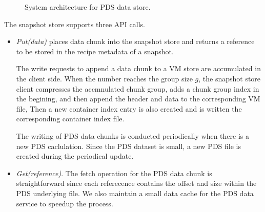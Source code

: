 \begin{figure}[htbp]
  \centering
  \caption{System architecture for PDS data store.}
  \label{fig:as_arch}
\end{figure}

The snapshot  store supports three API calls.
\begin{itemize}

\item {\em Put(data)} places data chunk into the snapshot store and returns a reference to be stored in 
the recipe metadata of a snapshot. 

The write requests to append a data chunk to a VM store are accumulated in the client side. 
When the number reaches the group size $g$, the snapshot store client compresses
the accmnulated   chunk group, adds a chunk group index  in the begining, and then
append the header and data  to the corresponding VM file,
Then a new container  index entry is also created and is written the corresponding
container index file.

The writing of PDS data chunks is conducted periodically when there is a new PDS caclulation.
Since the PDS dataset is small, a new PDS file is created during the periodical update.
\item{\em Get(reference)}.
The fetch operation for the PDS data chunk is straightforward since each referecence contains 
the offset and size within the PDS  underlying  file.
We also maintain a small data cache for the PDS data service to speedup the process.


\end{itemize}
